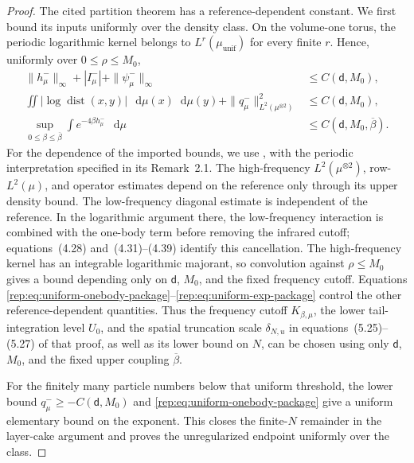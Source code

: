 \documentclass[11pt,reqno]{amsart}
\numberwithin{equation}{section}
\theoremstyle{plain}
\theoremstyle{definition}
\renewcommand{\d}{\mathsf d}
\newcommand{\dd}{\mathop{}\!\mathrm d}
\newcommand{\be}{\beta}
\newcommand{\muunif}{\mu_{\mathrm{unif}}}
\begin{document}
\begin{proof}
The cited partition theorem has a reference-dependent constant. We first bound its inputs uniformly over the density class.  On the volume-one torus, the periodic logarithmic kernel belongs to $L^r(\muunif)$ for every finite $r$.  Hence, uniformly over $0\le\rho\le M_0$,
\begin{align}
 \|h^-_\mu\|_\infty+|I^-_\mu|+\|\psi^-_\mu\|_\infty&\le C(\d,M_0),\label{rep:eq:uniform-onebody-package}\\
 \iint |\log\operatorname{dist}(x,y)|\,\dd\mu(x)\dd\mu(y)
 +\|q^-_\mu\|_{L^2(\mu^{\otimes2})}^2&\le C(\d,M_0),\label{rep:eq:uniform-log-package}\\
 \sup_{0\le\be\le\overline\be}
 \int e^{-4\be h^-_\mu}\,\dd\mu&\le C(\d,M_0,\overline\be).
 \label{rep:eq:uniform-exp-package}
\end{align}
For the dependence of the imported bounds, we use \cite[Section~4.2, Lemma~4.3(ii), and Section~5.1.2]{DelgadinoGvalaniRosenzweig2026}, with the periodic interpretation specified in its Remark~2.1. The high-frequency $L^2(\mu^{\otimes2})$, row-$L^2(\mu)$, and operator estimates depend on the reference only through its upper density bound. The low-frequency diagonal estimate is independent of the reference. In the logarithmic argument there, the low-frequency interaction is combined with the one-body term before removing the infrared cutoff; equations~(4.28) and~(4.31)--(4.39) identify this cancellation. The high-frequency kernel has an integrable logarithmic majorant, so convolution against $\rho\le M_0$ gives a bound depending only on $\d$, $M_0$, and the fixed frequency cutoff. Equations \eqref{rep:eq:uniform-onebody-package}--\eqref{rep:eq:uniform-exp-package} control the other reference-dependent quantities. Thus the frequency cutoff $K_{\be,\mu}$, the lower tail-integration level $U_0$, and the spatial truncation scale $\delta_{N,u}$ in equations~(5.25)--(5.27) of that proof, as well as its lower bound on $N$, can be chosen using only $\d$, $M_0$, and the fixed upper coupling $\overline\be$.

For the finitely many particle numbers below that uniform threshold, the lower bound $q^-_\mu\ge-C(\d,M_0)$ and \eqref{rep:eq:uniform-onebody-package} give a uniform elementary bound on the exponent.  This closes the finite-$N$ remainder in the layer-cake argument and proves the unregularized endpoint uniformly over the class.


\end{proof}
\end{document}
